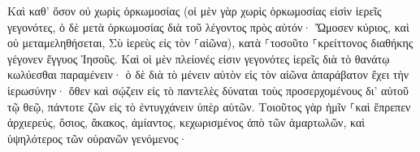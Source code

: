 \documentclass{openreader}
\begin{document}
Καὶ καθ’ ὅσον οὐ χωρὶς ὁρκωμοσίας (οἱ μὲν γὰρ χωρὶς ὁρκωμοσίας εἰσὶν ἱερεῖς γεγονότες, 
ὁ δὲ μετὰ ὁρκωμοσίας διὰ τοῦ λέγοντος πρὸς αὐτόν· Ὤμοσεν κύριος, καὶ οὐ μεταμεληθήσεται, Σὺ ἱερεὺς εἰς τὸν ⸀αἰῶνα), 
κατὰ ⸀τοσοῦτο ⸀κρείττονος διαθήκης γέγονεν ἔγγυος Ἰησοῦς. 
Καὶ οἱ μὲν πλείονές εἰσιν γεγονότες ἱερεῖς διὰ τὸ θανάτῳ κωλύεσθαι παραμένειν· 
ὁ δὲ διὰ τὸ μένειν αὐτὸν εἰς τὸν αἰῶνα ἀπαράβατον ἔχει τὴν ἱερωσύνην· 
ὅθεν καὶ σῴζειν εἰς τὸ παντελὲς δύναται τοὺς προσερχομένους δι’ αὐτοῦ τῷ θεῷ, πάντοτε ζῶν εἰς τὸ ἐντυγχάνειν ὑπὲρ αὐτῶν. 
Τοιοῦτος γὰρ ἡμῖν ⸀καὶ ἔπρεπεν ἀρχιερεύς, ὅσιος, ἄκακος, ἀμίαντος, κεχωρισμένος ἀπὸ τῶν ἁμαρτωλῶν, καὶ ὑψηλότερος τῶν οὐρανῶν γενόμενος· 
\end{document}
